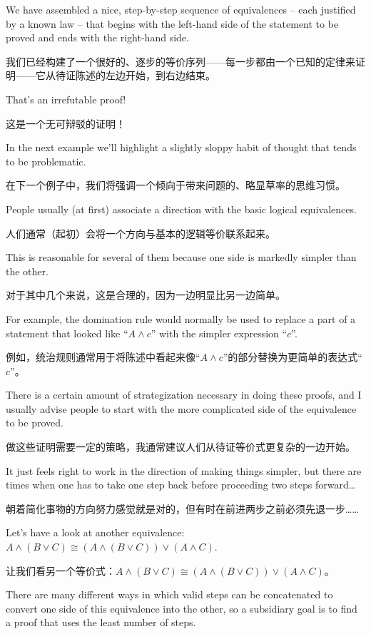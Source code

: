 We have assembled a nice, step-by-step sequence of equivalences -- each
justified by a known law -- that begins with the left-hand side of the 
statement to be proved and ends with the right-hand side.

我们已经构建了一个很好的、逐步的等价序列——每一步都由一个已知的定律来证明——它从待证陈述的左边开始，到右边结束。

That's an 
irrefutable proof!

这是一个无可辩驳的证明！

In the next example we'll highlight a slightly sloppy habit of thought
that tends to be problematic.

在下一个例子中，我们将强调一个倾向于带来问题的、略显草率的思维习惯。

People usually (at first) associate a 
direction with the basic logical equivalences.

人们通常（起初）会将一个方向与基本的逻辑等价联系起来。

This is reasonable 
for several of them because one side is markedly simpler than the 
other.

对于其中几个来说，这是合理的，因为一边明显比另一边简单。

For example, the domination rule would normally be used
to replace a part of a statement that looked like ``$A \land c$'' with
the simpler expression ``$c$''.

例如，统治规则通常用于将陈述中看起来像“$A \land c$”的部分替换为更简单的表达式“$c$”。

There is a certain amount of strategization
necessary in doing these proofs, and I usually advise people to start 
with the more complicated side of the equivalence to be proved.

做这些证明需要一定的策略，我通常建议人们从待证等价式更复杂的一边开始。

It just
feels right to work in the direction of making things simpler, but there 
are times when one has to take one step back before proceeding two steps
forward\ldots   

朝着简化事物的方向努力感觉就是对的，但有时在前进两步之前必须先退一步……

Let's have a look at another equivalence: $A \land (B \lor C) \cong 
(A \land (B \lor C)) \lor (A \land C)$.

让我们看另一个等价式：$A \land (B \lor C) \cong (A \land (B \lor C)) \lor (A \land C)$。

There are many different ways
in which valid steps can be concatenated to convert one side of this 
equivalence into the other, so a subsidiary goal is to find a proof that
uses the least number of steps.

